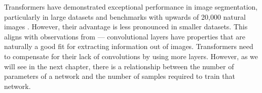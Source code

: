  Transformers have demonstrated exceptional performance in image segmentation, particularly in large datasets and benchmarks with upwards of 20,000 natural images \cite{liu2021Swin, SETR, chen2022vitadapter}. However, their advantage is less pronounced in smaller datasets. This aligns with observations from \cite{attnAllYouNeed} --- convolutional layers have properties that are naturally a good fit for extracting information out of images. Transformers need to compensate for their lack of convolutions by using more layers. However, as we will see in the next chapter, there is a relationship between the number of parameters of a network and the number of samples required to train that network.


